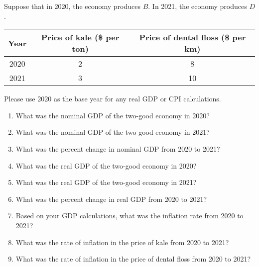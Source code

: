 \documentclass[
    letterpaper,paper=portrait,fleqn,
    DIV=16,fontsize=12pt,twoside=semi,
    parskip=full-,
    headings=standardclasses]
{scrartcl}
\begin{document}
\clearpage

Suppose that in 2020, the economy produces $B$. In 2021, the economy produces $D$.

\begin{tabular}{ccc}
\toprule
Year & Price of kale (\$ per ton) & Price of dental floss (\$ per km) \\
\midrule
2020 & 2 &  8 \\
2021 & 3 & 10 \\
\bottomrule
\end{tabular}

Please use 2020 as the base year for any real GDP or CPI calculations.

\begin{enumerate}[resume]

\item What was the nominal GDP of the two-good economy in 2020?

\vfill

\item What was the nominal GDP of the two-good economy in 2021?

\vfill

\item What was the percent change in nominal GDP from 2020 to 2021?

\vfill

\item What was the real GDP of the two-good economy in 2020?

\vfill

\item What was the real GDP of the two-good economy in 2021?

\vfill

\item What was the percent change in real GDP from 2020 to 2021?

\vfill

\vspace{-2\baselineskip}

\clearpage

\item Based on your GDP calculations, what was the inflation rate from 2020 to 2021?

\vfill

\item What was the rate of inflation in the price of kale from 2020 to 2021?

\vfill

\item What was the rate of inflation in the price of dental floss from 2020 to 2021?


\end{enumerate}
\end{document}
